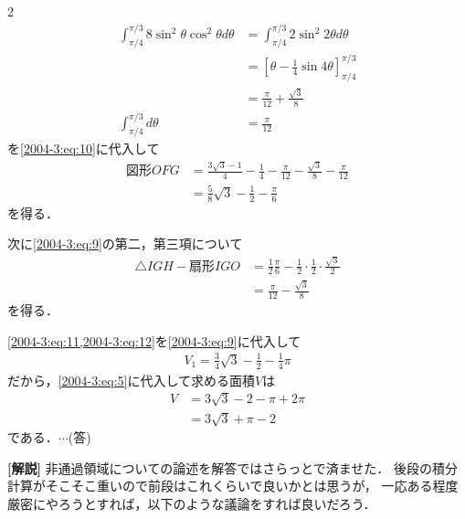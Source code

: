 \documentclass[../../../../main.tex]{subfiles}
\begin{document}
\begin{multicols}{2}
\begin{align*}
    \int_{\pi/4}^{\pi/3} 8\sin^2\theta\cos^2\theta d\theta
     & = \int_{\pi/4}^{\pi/3} 2\sin^2 2\theta d\theta                                    \\
     & = \left[\theta - \frac{1}{4}\sin 4\theta \right]_{\pi/4}^{\pi/3}                  \\
     & = \frac{\pi}{12} + \frac{\sqrt{3}}{8}                                             \\
    \int_{\pi/4}^{\pi/3} d\theta
     & = \frac{\pi}{12}
  \end{align*}
  を\cref{2004-3:eq:10}に代入して
  \begin{align}
    \text{図形}OFG
     & = \frac{3\sqrt{3}-1}{4} - \frac{1}{4} - \frac{\pi}{12} - \frac{\sqrt{3}}{8} - \frac{\pi}{12} \\
     & = \frac{5}{8}\sqrt{3} - \frac{1}{2} - \frac{\pi}{6} \label{2004-3:eq:11}
  \end{align}
  を得る．

  次に\cref{2004-3:eq:9}の第二，第三項について
  \begin{align}
    \triangle IGH - \text{扇形}IGO
     & = \frac{1}{2}\frac{\pi}{6} - \frac{1}{2}\cdot \frac{1}{2} \cdot \frac{\sqrt{3}}{2} \\
     & = \frac{\pi}{12} - \frac{\sqrt{3}}{8} \label{2004-3:eq:12}
  \end{align}
  を得る．

  \cref{2004-3:eq:11,2004-3:eq:12}を\cref{2004-3:eq:9}に代入して
  \begin{align*}
    V_1 = \frac{3}{4}\sqrt{3} - \frac{1}{2} - \frac{1}{4}\pi
  \end{align*}
  だから，\cref{2004-3:eq:5}に代入して求める面積$V$は
  \begin{align*}
    V
     &
    = 3\sqrt{3}-2-\pi+2\pi \\
     & = 3\sqrt{3}+\pi-2
  \end{align*}
  である．$\cdots$(答)

  \vspace{10pt}
  {\bf[解説]}
  非通過領域についての論述を解答ではさらっとで済ませた．
  後段の積分計算がそこそこ重いので前段はこれくらいで良いかとは思うが，
  一応ある程度厳密にやろうとすれば，以下のような議論をすれば良いだろう．


\end{multicols}
\end{document}

